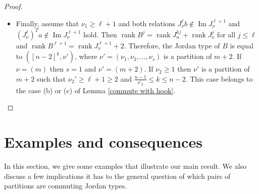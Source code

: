 \documentclass[11pt]{amsproc}
\DeclareMathOperator{\im}{Im}
\DeclareMathOperator{\rank}{rank}
\begin{document}
\begin{proof}
\begin{itemize}
\item[(v)] Finally, assume that $\nu_1\ge\ell +1$ and both relations $J_{\nu}^{\ell}b\notin\im J_{\nu}^{\ell +1}$ and $\left(J_{\nu}^{\ell}\right)^Ta\notin\im J_{\nu}^{\ell +1} $ hold. Then $\rank B^j=\rank J_n^{kj}+\rank J_{\nu}^j $ for all $j\leq \ell$ and $\rank B^{\ell +1} =\rank J_{\nu}^{\ell +1} +2$. Therefore, the Jordan type of $B$ is equal to $([n-2]^k,\nu')$, where $\nu'=(\nu_1,\nu_2,\ldots,\nu_s)$ is a partition of $m+2$. If $\nu=(m)$ then $s=1$ and $\nu'=(m+2)$. If $\nu_2\ge 1$ then $\nu'$ is a partition of $m+2$ such that $\nu_2'\ge \ell+1\ge 2$ and $\frac{n-1}{\nu'_2}\leq k \leq n-2$. This case belongs to the case (b) or (c) of Lemma \ref{commute with hook}.
\end{itemize}
\end{proof}


\section{Examples and consequences}\label{consequences}

In this section, we give some examples that illustrate our main result. We also discuss a few implications it has to the general question of which pairs of partitions are commuting Jordan types.
\end{document}
